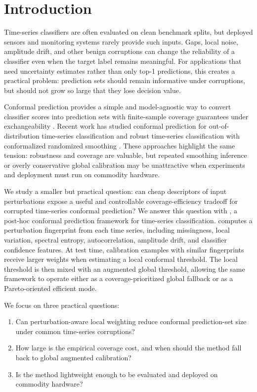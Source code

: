 \section{Introduction}

Time-series classifiers are often evaluated on clean benchmark splits, but deployed sensors and monitoring systems rarely provide such inputs. Gaps, local noise, amplitude drift, and other benign corruptions can change the reliability of a classifier even when the target label remains meaningful. For applications that need uncertainty estimates rather than only top-1 predictions, this creates a practical problem: prediction sets should remain informative under corruptions, but should not grow so large that they lose decision value.

Conformal prediction provides a simple and model-agnostic way to convert classifier scores into prediction sets with finite-sample coverage guarantees under exchangeability \citep{vovk2005algorithmic,angelopoulos2021gentle}. Recent work has studied conformal prediction for out-of-distribution time-series classification \citep{nanopoulos2025conformal} and robust time-series classification with conformalized randomized smoothing \citep{franco2024guaranteeing}. These approaches highlight the same tension: robustness and coverage are valuable, but repeated smoothing inference or overly conservative global calibration may be unattractive when experiments and deployment must run on commodity hardware.

We study a smaller but practical question: can cheap descriptors of input perturbations expose a useful and controllable coverage-efficiency tradeoff for corrupted time-series conformal prediction? We answer this question with \fastcp, a post-hoc conformal prediction framework for time-series classification. \fastcp{} computes a perturbation fingerprint from each time series, including missingness, local variation, spectral entropy, autocorrelation, amplitude drift, and classifier confidence features. At test time, calibration examples with similar fingerprints receive larger weights when estimating a local conformal threshold. The local threshold is then mixed with an augmented global threshold, allowing the same framework to operate either as a coverage-prioritized global fallback or as a Pareto-oriented efficient mode.

We focus on three practical questions:
\begin{enumerate}
    \item[\textbf{RQ1}] Can perturbation-aware local weighting reduce conformal prediction-set size under common time-series corruptions?
    \item[\textbf{RQ2}] How large is the empirical coverage cost, and when should the method fall back to global augmented calibration?
    \item[\textbf{RQ3}] Is the method lightweight enough to be evaluated and deployed on commodity hardware?
\end{enumerate}

